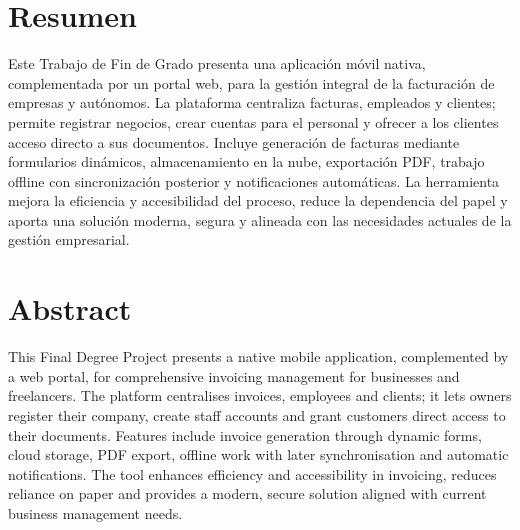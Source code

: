 \setlength{\parskip}{8mm}

\section*{Resumen}

{\large
Este Trabajo de Fin de Grado presenta una aplicación móvil nativa, complementada por un portal web, para la gestión integral de la facturación de empresas y autónomos. La plataforma centraliza facturas, empleados y clientes; permite registrar negocios, crear cuentas para el personal y ofrecer a los clientes acceso directo a sus documentos. Incluye generación de facturas mediante formularios dinámicos, almacenamiento en la nube, exportación PDF, trabajo offline con sincronización posterior y notificaciones automáticas. La herramienta mejora la eficiencia y accesibilidad del proceso, reduce la dependencia del papel y aporta una solución moderna, segura y alineada con las necesidades actuales de la gestión empresarial.
}

\newpage

\section*{Abstract}

{\large
This Final Degree Project presents a native mobile application, complemented by a web portal, for comprehensive invoicing management for businesses and freelancers. The platform centralises invoices, employees and clients; it lets owners register their company, create staff accounts and grant customers direct access to their documents. Features include invoice generation through dynamic forms, cloud storage, PDF export, offline work with later synchronisation and automatic notifications. The tool enhances efficiency and accessibility in invoicing, reduces reliance on paper and provides a modern, secure solution aligned with current business management needs.
}